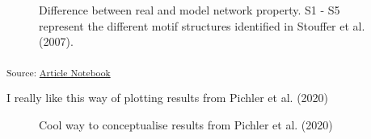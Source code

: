 \documentclass[
]{article}
\begin{document}
\begin{figure}[H]


\caption{\label{fig-topology}Difference between real and model network
property. S1 - S5 represent the different motif structures identified in
Stouffer et al. (2007).}

\end{figure}%

\textsubscript{Source:
\href{https://BecksLab.github.io/ms_t_is_for_topology/index.qmd.html}{Article
Notebook}}

I really like this way of plotting results from Pichler et al. (2020)

\begin{figure}


\caption{\label{fig-pichler}Cool way to conceptualise results from
Pichler et al. (2020)}

\end{figure}%
\end{document}
